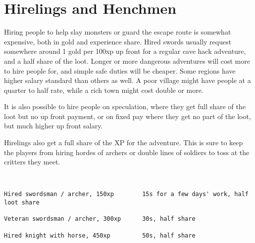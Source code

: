 \section*{Hirelings and Henchmen}
Hiring people to help slay monsters or guard the escape route is somewhat expensive, both in gold and experience share. Hired swords usually request somewhere around 1 gold per 100xp up front for a regular cave hack adventure, and a half share of the loot. Longer or more dangerous adventures will cost more to hire people for, and simple safe duties will be cheaper. Some regions have higher salary standard than others as well. A poor village might have people at a quarter to half rate, while a rich town might cost double or more.

It is also possible to hire people on speculation, where they get full share of the loot but no up front payment, or on fixed pay where they get no part of the loot, but much higher up front salary.

Hirelings also get a full share of the XP for the adventure. This is sure to keep the players from hiring hordes of archers or double lines of soldiers to toss at the critters they meet.

\

\small \begin{verbatim}
Hired swordsman / archer, 150xp        15s for a few days' work, half loot share

Veteran swordsman / archer, 300xp      30s, half share

Hired knight with horse, 450xp         50s, half share
\end{verbatim} \normalsize

